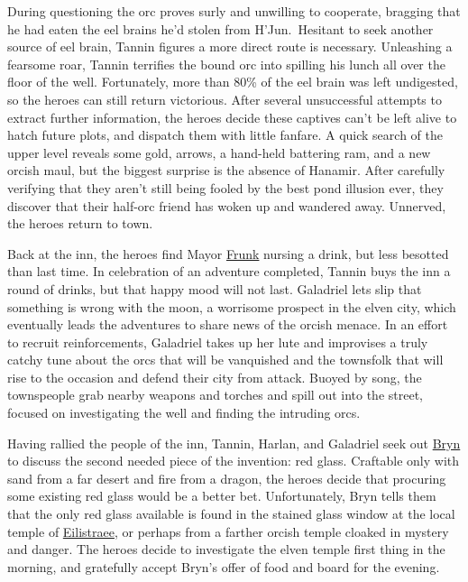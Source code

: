 \documentclass[smalldemyvopaper,11pt,twoside,onecolumn,openright,extrafontsizes]{memoir}
\begin{document}
During questioning the orc proves surly and unwilling to cooperate,
bragging that he had eaten the eel brains he'd stolen from
H'Jun.~Hesitant to seek another source of eel brain, Tannin figures a
more direct route is necessary. Unleashing a fearsome roar, Tannin
terrifies the bound orc into spilling his lunch all over the floor of
the well. Fortunately, more than 80\% of the eel brain was left
undigested, so the heroes can still return victorious. After several
unsuccessful attempts to extract further information, the heroes decide
these captives can't be left alive to hatch future plots, and dispatch
them with little fanfare. A quick search of the upper level reveals some
gold, arrows, a hand-held battering ram, and a new orcish maul, but the
biggest surprise is the absence of Hanamir. After carefully verifying
that they aren't still being fooled by the best pond illusion ever, they
discover that their half-orc friend has woken up and wandered away.
Unnerved, the heroes return to town.

Back at the inn, the heroes find Mayor \href{/characters/frunk/}{Frunk}
nursing a drink, but less besotted than last time. In celebration of an
adventure completed, Tannin buys the inn a round of drinks, but that
happy mood will not last. Galadriel lets slip that something is wrong
with the moon, a worrisome prospect in the elven city, which eventually
leads the adventures to share news of the orcish menace. In an effort to
recruit reinforcements, Galadriel takes up her lute and improvises a
truly catchy tune about the orcs that will be vanquished and the
townsfolk that will rise to the occasion and defend their city from
attack. Buoyed by song, the townspeople grab nearby weapons and torches
and spill out into the street, focused on investigating the well and
finding the intruding orcs.

Having rallied the people of the inn, Tannin, Harlan, and Galadriel seek
out \href{/characters/bryn/}{Bryn} to discuss the second needed piece of
the invention: red glass. Craftable only with sand from a far desert and
fire from a dragon, the heroes decide that procuring some existing red
glass would be a better bet. Unfortunately, Bryn tells them that the
only red glass available is found in the stained glass window at the
local temple of \href{/characters/eilistraee/}{Eilistraee}, or perhaps
from a farther orcish temple cloaked in mystery and danger. The heroes
decide to investigate the elven temple first thing in the morning, and
gratefully accept Bryn's offer of food and board for the evening.
\end{document}
